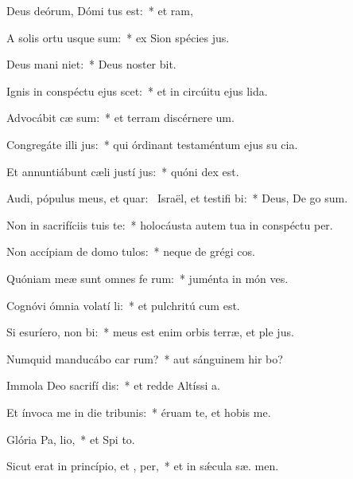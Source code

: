 \item Deus deórum, Dómi tus est:~* et  ram,
\item A solis ortu usque  sum:~* ex Sion spécies  jus.
\item Deus mani niet:~* Deus noster   bit.
\item Ignis in conspéctu ejus scet:~* et in circúitu ejus  lida.
\item Advocábit cæ sum:~* et terram discérnere  um.
\item Congregáte illi  jus:~* qui órdinant testaméntum ejus su cia.
\item Et annuntiábunt cæli justí jus:~* quóni  dex est.
\item Audi, pópulus meus, et quar:~\pscross{} Israël, et testifi bi:~* Deus, De  go sum.
\item Non in sacrifíciis tuis  te:~* holocáusta autem tua in conspéctu   per.
\item Non accípiam de domo  tulos:~* neque de grégi  cos.
\item Quóniam meæ sunt omnes fe rum:~* juménta in món  ves.
\item Cognóvi ómnia volatí li:~* et pulchritú  cum est.
\item Si esuríero, non  bi:~* meus est enim orbis terræ, et ple jus.
\item Numquid manducábo car rum?~* aut sánguinem hir bo?
\item Immola Deo sacrifí dis:~* et redde Altíssi  a.
\item Et ínvoca me in die tribunis:~* éruam te, et hobis me.
\item Glória Pa,  lio,~* et Spi to.
\item Sicut erat in princípio, et ,  per,~* et in sǽcula sæ. men.
